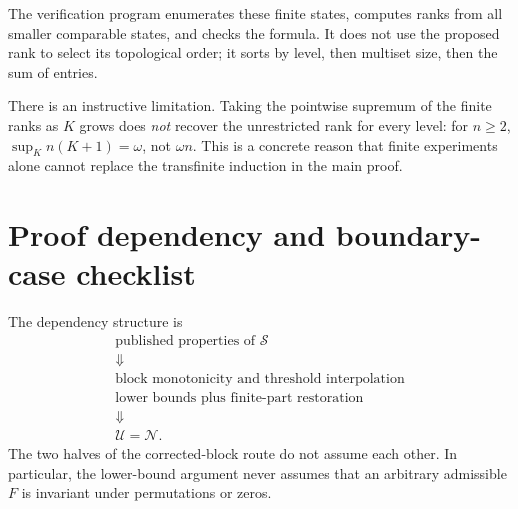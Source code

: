 \documentclass[11pt,a4paper]{article}
\theoremstyle{definition}
\newcommand{\OpN}{\mathcal N}
\newcommand{\OpS}{\mathcal S}
\begin{document}
The verification program enumerates these finite states, computes ranks from all smaller comparable states, and checks the formula. It does not use the proposed rank to select its topological order; it sorts by level, then multiset size, then the sum of entries.

There is an instructive limitation. Taking the pointwise supremum of the finite ranks as $K$ grows does \emph{not} recover the unrestricted rank for every level: for $n\ge2$, $\sup_K n(K+1)=\omega$, not $\omega n$. This is a concrete reason that finite experiments alone cannot replace the transfinite induction in the main proof.

\section{Proof dependency and boundary-case checklist}\label{block:app:audit}

The dependency structure is
\[
\begin{gathered}
 \text{published properties of }\OpS\\
 \Downarrow\\
 \text{block monotonicity and threshold interpolation}\\
 \text{lower bounds plus finite-part restoration}\\
 \Downarrow\\
 \mathcal U=\OpN.
\end{gathered}
\]
The two halves of the corrected-block route do not assume each other. In particular, the lower-bound argument never assumes that an arbitrary admissible $F$ is invariant under permutations or zeros.
\end{document}
